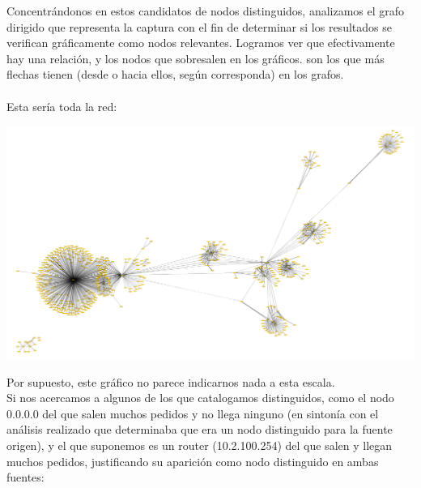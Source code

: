 \indent Concentrándonos en estos candidatos de nodos distinguidos, analizamos el grafo dirigido que representa la captura con el fin de determinar si los resultados se verifican gráficamente como nodos relevantes. Logramos ver que efectivamente hay una relación, y los nodos que sobresalen en los gráficos. son los que más flechas tienen (desde o hacia ellos, según corresponda) en los grafos.\\
\\
\indent Esta sería toda la red:\\
\begin{center}
\includegraphics[scale=0.5,clip=true,trim=140 0 0 0]{graphics/toda_la_red.png}
\end{center}
\newpage
\indent Por supuesto, este gráfico no parece indicarnos nada a esta escala.\\
\indent Si nos acercamos a algunos de los que catalogamos distinguidos, como el nodo 0.0.0.0 del que salen muchos pedidos y no llega ninguno (en sintonía con el análisis realizado que determinaba que era un nodo distinguido para la fuente origen), y el que suponemos es un router (10.2.100.254) del que salen y llegan muchos pedidos, justificando su aparición como nodo distinguido en ambas fuentes:\\

